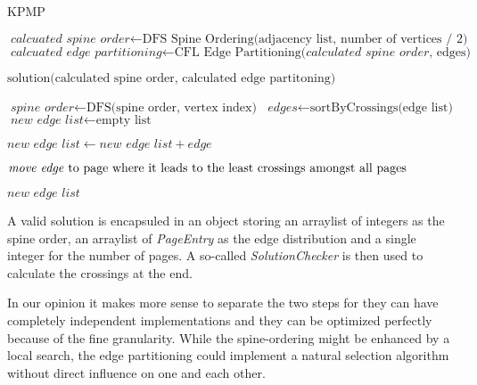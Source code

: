 \documentclass[11pt]{article}
\begin{document}
\begin{algorithm}
	\caption{KPMP}\label{euclid}
	\begin{algorithmic}[1]
		\State $\textit{calcuated spine order} \gets \text{DFS Spine Ordering(adjacency list, number of vertices / 2)}$
		\State $\textit{calcuated edge partitioning} \gets \text{CFL Edge Partitioning($\textit{calculated spine order}$, edges)}$
		
		\Return $\text{solution(calculated spine order, calculated edge partitoning)}$
		\EndFunction
		\newline
		
		\Return $\textit{spine order} \gets \text{DFS(spine order, vertex index)}$
		\EndFunction
		\newline
		\State $\textit{edges} \gets \text{sortByCrossings(edge list)}$
		\State $\textit{new edge list} \gets \text{empty list}$
		\newline

		$\textit{new edge list} \gets \textit{new edge list} + edge $
		
		$\text{\textit{move edge} to page where it leads to the least crossings amongst all pages}$
		\EndWhile
		
		\Return $\textit{new edge list}$
		\EndFunction
	\end{algorithmic}
\end{algorithm}
\pagebreak
\newline
A valid solution is encapsuled in an object storing an arraylist of integers as the spine order, an arraylist of \textit{PageEntry} as the edge distribution and a single integer for the number of pages. A so-called \textit{SolutionChecker} is then used to calculate the crossings at the end.

In our opinion it makes more sense to separate the two steps for they can have completely independent implementations and they can be optimized perfectly because of the fine granularity. While the spine-ordering might be enhanced by a local search, the edge partitioning could implement a natural selection algorithm without direct influence on one and each other.
\end{document}
